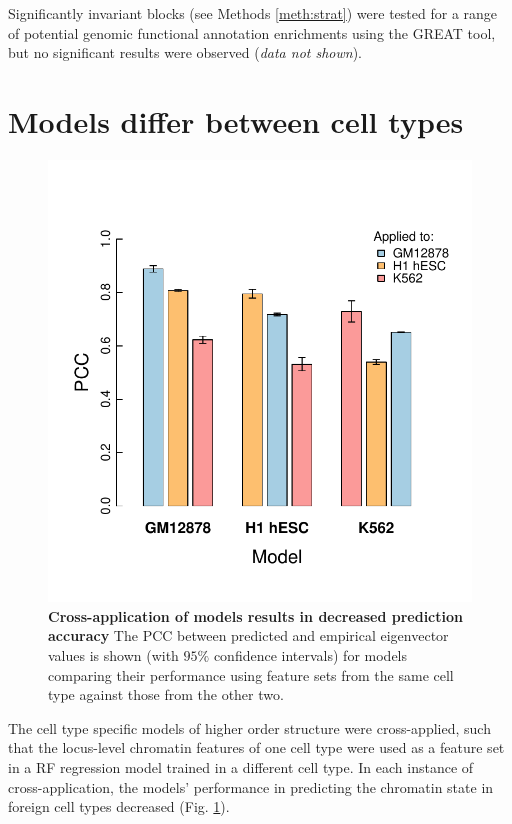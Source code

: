 \documentclass[a4paper]{report}
\begin{document}
Significantly invariant blocks (see Methods \ref{meth:strat}) were
tested for a range of potential genomic functional annotation enrichments using the GREAT
tool,\cite{McLean2010} but no significant results were observed
(\emph{data not shown}). \\


\pagebreak

\section{Models differ between cell types}\label{sec:xapp}
\begin{figure}
\vspace{-36pt}
\includegraphics[width=.55\textwidth]{figs/xappBars.pdf}
\vspace{-36pt}
\captionsetup{width=.5\textwidth}
\caption{ {\bf Cross-application of models results in decreased
    prediction accuracy} The PCC between predicted and empirical
  eigenvector values is shown (with $95\%$ confidence intervals) for
  models comparing their performance using feature sets from the same
  cell type against those from the other two.
}\label{fig:xapp}
\vspace{-6pt}
\end{figure}
The cell type specific models of higher order structure were
cross-applied, such that the locus-level chromatin features of one cell
type were used as a feature set in a RF regression model trained in a
different cell type. In each instance of cross-application, the
models' performance in predicting the chromatin state in foreign
cell types decreased (Fig. \ref{fig:xapp}). \\
\end{document}
